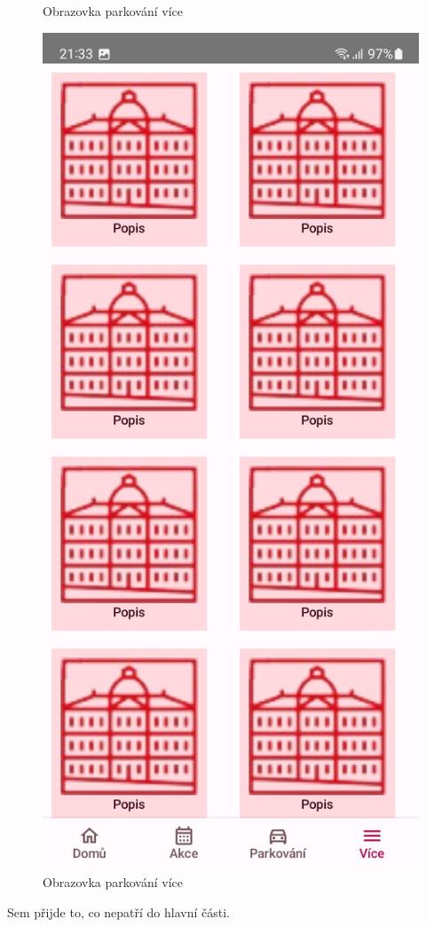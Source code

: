 \begin{figure}[H]
    \caption{Obrazovka parkování více}
  \endminipage\hfill
    \includegraphics[width=\linewidth]{screens/4.jpg}
    \caption{Obrazovka parkování více}
  \endminipage\hfill
\end{figure}


Sem přijde to, co nepatří do hlavní části.
